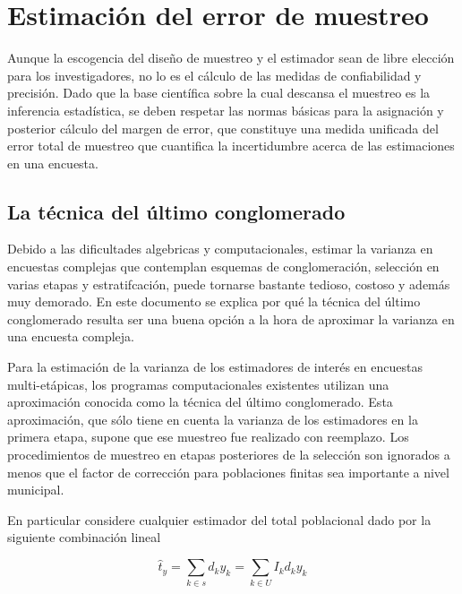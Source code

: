 \documentclass[12pt,spanish,]{book}
\begin{document}
\hypertarget{estimacion-del-error-de-muestreo}{%
\section{Estimación del error de muestreo}\label{estimacion-del-error-de-muestreo}}

Aunque la escogencia del diseño de muestreo y el estimador sean de libre elección para los investigadores, no lo es el cálculo de las medidas de confiabilidad y precisión. Dado que la base científica sobre la cual descansa el muestreo es la inferencia estadística, se deben respetar las normas básicas para la asignación y posterior cálculo del margen de error, que constituye una medida unificada del error total de muestreo que cuantifica la incertidumbre acerca de las estimaciones en una encuesta.

\hypertarget{la-tecnica-del-ultimo-conglomerado}{%
\subsection{La técnica del último conglomerado}\label{la-tecnica-del-ultimo-conglomerado}}

Debido a las dificultades algebricas y computacionales, estimar la varianza en encuestas complejas que contemplan esquemas de conglomeración, selección en varias etapas y estratifcación, puede tornarse bastante tedioso, costoso y además muy demorado. En este documento se explica por qué la técnica del último conglomerado resulta ser una buena opción a la hora de aproximar la varianza en una encuesta compleja.

Para la estimación de la varianza de los estimadores de interés en encuestas multi-etápicas, los programas computacionales existentes utilizan una aproximación conocida como la técnica del último conglomerado. Esta aproximación, que sólo tiene en cuenta la varianza de los estimadores en la primera etapa, supone que ese muestreo fue realizado con reemplazo. Los procedimientos de muestreo en etapas posteriores de la selección son ignorados a menos que el factor de corrección para poblaciones finitas sea importante a nivel municipal.

En particular considere cualquier estimador del total poblacional dado por la siguiente combinación lineal

\begin{equation}
\label{est}
\hat{t}_{y}=\sum_{k\in s} d_k y_k = \sum_{k\in U} I_k d_k y_k 
\end{equation}
\end{document}

